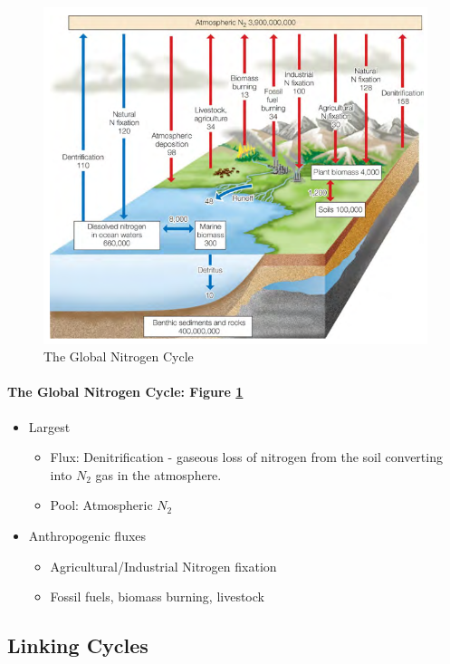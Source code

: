 \documentclass[12pt]{article}
\begin{document}
\begin{figure}[tph]
    \centering
    \includegraphics[width=5in]{global-nitrogen-cycle.png}
    \caption{The Global Nitrogen Cycle}
    \label{global-nitrogen}
\end{figure}

\paragraph{The Global Nitrogen Cycle: Figure \ref{global-nitrogen}}
\begin{itemize}
    \item Largest
          \begin{itemize}
              \item Flux: Denitrification - gaseous loss of nitrogen from the soil converting into $N_2$ gas in the atmosphere.
              \item Pool: Atmospheric $N_2$
          \end{itemize}
    \item Anthropogenic fluxes
          \begin{itemize}
              \item Agricultural/Industrial Nitrogen fixation
              \item Fossil fuels, biomass burning, livestock
          \end{itemize}
\end{itemize}

\subsection{Linking Cycles}
\end{document}
